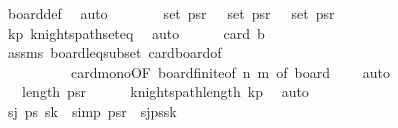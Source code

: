 \begin{isabellebody}
\ board{\isacharunderscore}{\kern0pt}def\ \isamarkupfalse%
\ auto\isanewline
\ \ \isamarkupfalse%
\ \isamarkupfalse%
\ {\isachardoublequoteopen}{\isacharparenleft}{\kern0pt}{}{\isacharcomma}{\kern0pt}{}{\isacharparenright}{\kern0pt}\ {\isasymin}\ set\ ps\isactrlsub r{\isachardoublequoteclose}\ {\isachardoublequoteopen}{\isacharparenleft}{\kern0pt}{}{\isacharcomma}{\kern0pt}{}{\isacharparenright}{\kern0pt}\ {\isasymin}\ set\ ps\isactrlsub r{\isachardoublequoteclose}\ {\isachardoublequoteopen}{\isacharparenleft}{\kern0pt}{}{\isacharcomma}{\kern0pt}{}{\isacharparenright}{\kern0pt}\ {\isasymin}\ set\ ps\isactrlsub r{\isachardoublequoteclose}\isanewline
\ \ \ \ \isamarkupfalse%
\ kp\ knights{\isacharunderscore}{\kern0pt}path{\isacharunderscore}{\kern0pt}set{\isacharunderscore}{\kern0pt}eq\ \isamarkupfalse%
\ auto\isanewline
\isanewline
\ \ \isamarkupfalse%
\ {\isachardoublequoteopen}{}\ {\isacharless}{\kern0pt}\ card\ {\isacharquery}{\kern0pt}b{\isachardoublequoteclose}\isanewline
\ \ \ \ \isamarkupfalse%
\ assms\ board{\isacharunderscore}{\kern0pt}leq{\isacharunderscore}{\kern0pt}subset\ card{\isacharunderscore}{\kern0pt}board{\isacharbrackleft}{\kern0pt}of\ {}\ {}{\isacharbrackright}{\kern0pt}\isanewline
\ \ \ \ \ \ \ \ \ \ card{\isacharunderscore}{\kern0pt}mono{\isacharbrackleft}{\kern0pt}OF\ board{\isacharunderscore}{\kern0pt}finite{\isacharbrackleft}{\kern0pt}of\ n\ m{\isacharbrackright}{\kern0pt}{\isacharcomma}{\kern0pt}\ of\ {\isachardoublequoteopen}board\ {}\ {}{\isachardoublequoteclose}{\isacharbrackright}{\kern0pt}\ \isamarkupfalse%
\ auto\isanewline
\ \ \isamarkupfalse%
\ \isamarkupfalse%
\ {\isachardoublequoteopen}{}\ {\isacharless}{\kern0pt}\ length\ ps\isactrlsub r{\isachardoublequoteclose}\isanewline
\ \ \ \ \isamarkupfalse%
\ knights{\isacharunderscore}{\kern0pt}path{\isacharunderscore}{\kern0pt}length\ kp\ \isamarkupfalse%
\ auto\isanewline
\ \ \isamarkupfalse%
\ \isamarkupfalse%
\ s\isactrlsub j\ ps{\isacharprime}{\kern0pt}\ s\isactrlsub k\ \ {\isacharbrackleft}{\kern0pt}simp{\isacharbrackright}{\kern0pt}{\isacharcolon}{\kern0pt}\ {\isachardoublequoteopen}ps\isactrlsub r\ {\isacharequal}{\kern0pt}\ {\isacharparenleft}{\kern0pt}{}{\isacharcomma}{\kern0pt}{}{\isacharparenright}{\kern0pt}{\isacharhash}{\kern0pt}s\isactrlsub j{\isacharhash}{\kern0pt}ps{\isacharprime}{\kern0pt}{\isacharat}{\kern0pt}{\isacharbrackleft}{\kern0pt}s\isactrlsub k{\isacharbrackright}{\kern0pt}{\isachardoublequoteclose}\isanewline

\end{isabellebody}
